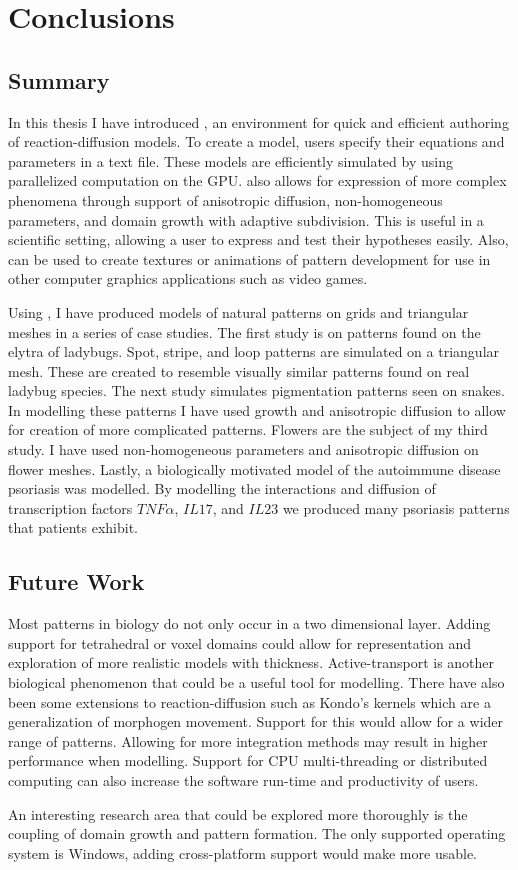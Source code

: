 \chapter{Conclusions}
\section{Summary}

In this thesis I have introduced \ProgramName{}, an environment for quick and efficient authoring of reaction-diffusion models. To create a model, users specify their equations and parameters in a text file. These models are efficiently simulated by using parallelized computation on the GPU. \ProgramName{} also allows for expression of more complex phenomena through support of anisotropic diffusion, non-homogeneous parameters, and domain growth with adaptive subdivision. This is useful in a scientific setting, allowing a user to express and test their hypotheses easily. Also, \ProgramName{} can be used to create textures or animations of pattern development for use in other computer graphics applications such as video games.

Using \ProgramName{}, I have produced models of natural patterns on grids and triangular meshes in a series of case studies. The first study is on patterns found on the elytra of ladybugs. Spot, stripe, and loop patterns are simulated on a triangular mesh. These are created to resemble visually similar patterns found on real ladybug species. The next study simulates pigmentation patterns seen on snakes. In modelling these patterns I have used growth and anisotropic diffusion to allow for creation of more complicated patterns. Flowers are the subject of my third study. I have used non-homogeneous parameters and anisotropic diffusion on flower meshes. Lastly, a biologically motivated model of the autoimmune disease psoriasis was modelled. By modelling the interactions and diffusion of transcription factors $TNF\alpha$, $IL17$, and $IL23$ we produced many psoriasis patterns that patients exhibit.

\section{Future Work}
Most patterns in biology do not only occur in a two dimensional layer. Adding support for tetrahedral or voxel domains could allow for representation and exploration of more realistic models with thickness. Active-transport is another biological phenomenon that could be a useful tool for modelling. There have also been some extensions to reaction-diffusion such as Kondo's kernels which are a generalization of morphogen movement. Support for this would allow for a wider range of patterns. Allowing for more integration methods may result in higher performance when modelling. Support for CPU multi-threading or distributed computing can also increase the software run-time and productivity of users. 

An interesting research area that could be explored more thoroughly is the coupling of domain growth and pattern formation. The only supported operating system is Windows, adding cross-platform support would make \ProgramName{} more usable.